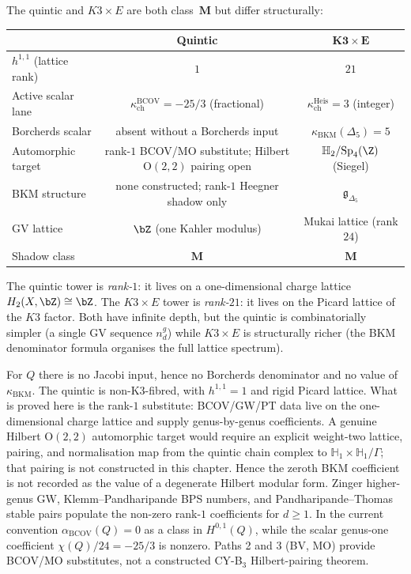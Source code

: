\begin{remark}
\label{rem:quintic-k3e-comparison}
The quintic and $K3 \times E$ are both class~$\mathbf{M}$ but differ structurally:
\begin{center}
\renewcommand{\arraystretch}{1.2}
\small
\begin{tabular}{lcc}
 \toprule
 & \textbf{Quintic} & $\boldsymbol{K3 \times E}$ \\
 \midrule
 $h^{1,1}$ (lattice rank) & $1$ & $21$ \\
 Active scalar lane & $\kappa_{\mathrm{ch}}^{\mathrm{BCOV}}=-25/3$ (fractional) & $\kappa_{\mathrm{ch}}^{\mathrm{Heis}}=3$ (integer) \\
 Borcherds scalar & absent without a Borcherds input & $\kappa_{\mathrm{BKM}}(\Delta_5)=5$ \\
 Automorphic target & rank-$1$ BCOV/MO substitute; Hilbert $\mathrm{O}(2,2)$ pairing open & $\mathbb H_2/\mathrm{Sp}_4(\Z)$ (Siegel) \\
 BKM structure & none constructed; rank-$1$ Heegner shadow only & $\mathfrak{g}_{\Delta_5}$ \\
 GV lattice & $\bZ$ (one Kahler modulus) & Mukai lattice (rank $24$) \\
 Shadow class & $\mathbf{M}$ & $\mathbf{M}$ \\
 \bottomrule
\end{tabular}
\end{center}
The quintic tower is \emph{rank-$1$}: it lives on a one-dimensional charge lattice $H_2(X, \bZ) \cong \bZ$. The $K3 \times E$ tower is \emph{rank-$21$}: it lives on the Picard lattice of the $K3$ factor. Both have infinite depth, but the quintic is combinatorially simpler (a single GV sequence $n^g_d$) while $K3 \times E$ is structurally richer (the BKM denominator formula organises the full lattice spectrum).

For \(Q\) there is no Jacobi input, hence no Borcherds denominator
and no value of \(\kappa_{\mathrm{BKM}}\). The quintic is
non-K3-fibred, with $h^{1,1} = 1$ and rigid Picard lattice. What is
proved here is the rank-$1$ substitute: BCOV/GW/PT data live on the
one-dimensional charge lattice and supply genus-by-genus coefficients.
A genuine Hilbert $\mathrm{O}(2,2)$ automorphic target would require an
explicit weight-two lattice, pairing, and normalisation map from the
quintic chain complex to $\mathbb H_1 \times \mathbb H_1/\Gamma$; that
pairing is not constructed in this chapter. Hence the zeroth BKM
coefficient is not recorded as the value of a degenerate Hilbert modular
form. Zinger higher-genus GW, Klemm--Pandharipande BPS numbers, and
Pandharipande--Thomas stable pairs populate the non-zero rank-$1$
coefficients for $d \geq 1$. In the current convention
$\alpha_{\mathrm{BCOV}}(Q)=0$ as a class in $H^{0,1}(Q)$, while the scalar
genus-one coefficient $\chi(Q)/24=-25/3$ is nonzero. Paths 2 and 3
\textup{(}BV, MO\textup{)} provide BCOV/MO substitutes, not a constructed
CY-B$_3$ Hilbert-pairing theorem.
\end{remark}

